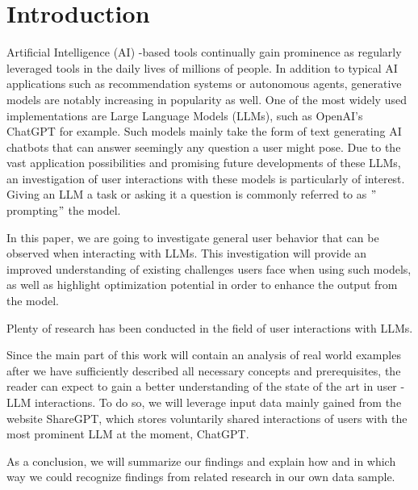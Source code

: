 
\section{Introduction}
\label{sec:introduction}

%
%
%



%
%
\sloppy %
Artificial Intelligence (AI) -based tools continually gain prominence as regularly leveraged tools in the
daily lives of millions of people.
In addition to typical AI applications such as recommendation systems or autonomous agents, generative
models are notably increasing in popularity as well.
One of the most widely used implementations are Large Language Models (LLMs), such as OpenAI's ChatGPT
for example.%
Such models mainly take the form of text generating AI chatbots that can answer seemingly
any question a user might pose.
Due to the vast application possibilities and promising future developments of these LLMs,
an investigation of user interactions with these models is particularly of interest.
Giving an LLM a task or asking it a question is commonly referred to as \("\)prompting\("\) the model.

In this paper, we are going to investigate general user behavior that can be observed when interacting
with LLMs.
This investigation will provide an improved understanding of existing challenges users face when
using such models, as well as highlight optimization potential in order to enhance the output from
the model.

Plenty of research has been conducted in the field of user interactions with LLMs.

Since the main part of this work will contain an analysis of real world examples after we have
sufficiently described all necessary concepts and prerequisites, the reader can expect to gain a better
understanding of the state of the art in user - LLM interactions.
To do so, we will leverage input data mainly gained from the website ShareGPT, %
which stores voluntarily shared interactions of users with the most prominent LLM at the moment,
ChatGPT. %

As a conclusion, we will summarize our findings and explain how and in which way we could recognize
findings from related research in our own data sample.